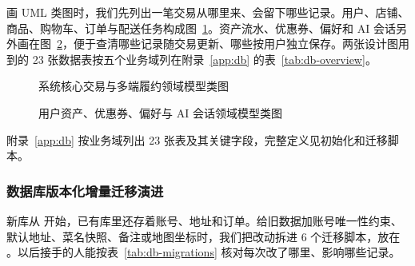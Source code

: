 画 UML 类图时，我们先列出一笔交易从哪里来、会留下哪些记录。用户、店铺、商品、购物车、订单与配送任务构成图~\ref{fig:def-domain-core}。资产流水、优惠券、偏好和 AI 会话另外画在图~\ref{fig:def-domain-assets}，便于查清哪些记录随交易更新、哪些按用户独立保存。两张设计图用到的 23 张数据表按五个业务域列在附录~\ref{app:db} 的表~\ref{tab:db-overview}。

\begin{figure}[!htbp]
  \centering
  \resizebox{.96\linewidth}{!}{}
  \caption{系统核心交易与多端履约领域模型类图}\label{fig:def-domain-core}
  \par\smallskip
\end{figure}

\begin{figure}[!htbp]
  \centering
  \resizebox{.96\linewidth}{!}{}
  \caption{用户资产、优惠券、偏好与 AI 会话领域模型类图}\label{fig:def-domain-assets}
  \par\smallskip
\end{figure}

附录~\ref{app:db} 按业务域列出 23 张表及其关键字段，完整定义见初始化和迁移脚本。

\subsubsection{数据库版本化增量迁移演进}
新库从  开始，已有库里还存着账号、地址和订单。给旧数据加账号唯一性约束、默认地址、菜名快照、备注或地图坐标时，我们把改动拆进 6 个迁移脚本，放在 。以后接手的人能按表~\ref{tab:db-migrations} 核对每次改了哪里、影响哪些记录。

